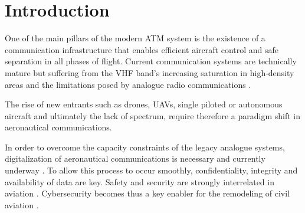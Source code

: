 \section{Introduction}
\label{Introduction}


One of the main pillars of the modern \ac{ATM} system is the existence of a communication infrastructure that enables efficient aircraft control and safe separation in all phases of flight. Current communication systems are technically mature but suffering from the \ac{VHF} band's increasing saturation in high-density areas and the limitations posed by analogue radio communications \cite{maeurer-raw-ldacs-05}.

The rise of new entrants such as drones, \acp{UAV}, single piloted or autonomous aircraft \cite{hall2020} and ultimately the lack of spectrum, require therefore a paradigm shift in aeronautical communications. 

In order to overcome the capacity constraints of the legacy analogue systems, digitalization of aeronautical communications is necessary \cite{mahmoud2014} and currently underway \cite{icao2019}. To allow this process to occur smoothly, confidentiality, integrity and availability of data are key. Safety and security are strongly interrelated in aviation \cite{mahmoud2014, standar2018}.  Cybersecurity becomes thus a key enabler for the remodeling of civil aviation \cite{maeurer20182, hall2020}.

